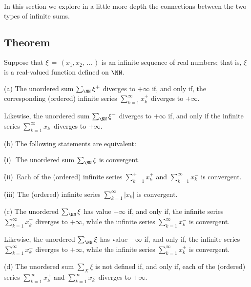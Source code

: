         In this section we explore in a little more depth the connections between the two types of infinite sums.

\V
\V

        \subsection{\small{{\bf Theorem}}}
        \label{ThmG40.20}

        Suppose that ${\xi} \,=\, (x_{1},x_{2},\,{\ldots}\,)$ is an infinite sequence of real numbers;
    that is, ${\xi}$ is a real-valued function defined on ${\NN}$.


\V

        (a) The unordered sum $\sum_{{\NN}} {\xi}^{+}$ diverges to $+{\infty}$ if, and only if,
    the corresponding (ordered) infinite series $\sum_{k=1}^{{\infty}} x_{k}^{+}$ diverges to $+{\infty}$.

        Likewise, the unordered sum $\sum_{{\NN}} {\xi}^{-}$ diverges to $+{\infty}$ if, and only if the infinite series $\sum_{k=1}^{{\infty}} x_{k}^{-}$ diverges to $+{\infty}$.

\V

        (b) The following statements are equivalent:

        \h (i)\,\, The unordered sum $\sum_{{\NN}} {\xi}$ is convergent.

        \h (ii)\, Each of the (ordered) infinite series $\sum_{k=1}^{+} x_{k}^{+}$ and $\sum_{k=1}^{{\infty}} x_{k}^{-}$ is convergent.

        \h (iii) The (ordered) infinite series $\sum_{k=1}^{{\infty}} |x_{k}|$ is convergent.                                      

\V

        (c) The unordered $\sum_{{\NN}} {\xi}$ has value $+{\infty}$ if, and only if,
    the infinite series $\sum_{k=1}^{{\infty}} x_{k}^{+}$ diverges to $+{\infty}$,
    while the infinite series $\sum_{k=1}^{{\infty}} x_{k}^{-}$ is convergent.

        Likewise, the unordered $\sum_{{\NN}} {\xi}$ has value $-{\infty}$ if, and only if,
    the infinite series $\sum_{k=1}^{{\infty}} x_{k}^{-}$ diverges to $+{\infty}$,
    while the infinite series $\sum_{k=1}^{{\infty}} x_{k}^{+}$ is convergent.

\V

        (d) The unordered sum $\sum_{X} {\xi}$ is not defined if, and only if, each of the (ordered) series $\sum_{k=1}^{{\infty}} x_{k}^{+}$
    and $\sum_{k=1}^{{\infty}} x_{k}^{-}$ diverges to $+{\infty}$.

